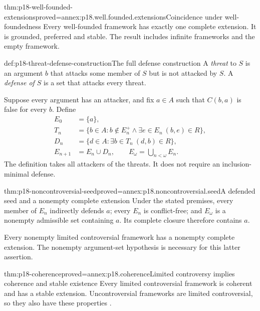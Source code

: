 \begin{hbtheorem}{thm:p18-well-founded-extensions}{proved=annex:p18.well.founded.extensions}{Coincidence under well-foundedness}
Every well-founded framework has exactly one
complete extension. It is grounded, preferred
and stable. The result includes infinite
frameworks and the empty framework.
\end{hbtheorem}

\begin{hbdefinition}{def:p18-threat-defense-construction}{The full defense construction}
A \emph{threat} to \(S\) is an argument \(b\)
that attacks some member of \(S\) but is
not attacked by \(S\). A \emph{defense of \(S\)}
is a set that attacks every threat.

Suppose every argument has an attacker, and
fix \(a\in A\) such that \(C(b,a)\) is false
for every \(b\). Define
\[
\begin{aligned}
 E_0&=\{a\},\\
 T_n&=\{b\in A:b\notin E_n^+\land\exists e\in E_n\ (b,e)\in R\},\\
 D_n&=\{d\in A:\exists b\in T_n\ (d,b)\in R\},\\
 E_{n+1}&=E_n\cup D_n,\qquad E_\omega=\bigcup_{n<\omega}E_n.
\end{aligned}
\]
The definition takes all attackers of the threats.
It does not require an inclusion-minimal defense.
\end{hbdefinition}

\begin{hblemma}{thm:p18-noncontroversial-seed}{proved=annex:p18.noncontroversial.seed}{A defended seed and a nonempty complete extension}
Under the stated premises, every member of
\(E_n\) indirectly defends \(a\); every
\(E_n\) is conflict-free; and \(E_\omega\)
is a nonempty admissible set containing
\(a\). Its complete closure therefore
contains \(a\).

Every nonempty limited controversial framework
has a nonempty complete extension. The
nonempty argument-set hypothesis is necessary
for this latter assertion.
\end{hblemma}

\begin{hbtheorem}{thm:p18-coherence}{proved=annex:p18.coherence}{Limited controversy implies coherence and stable existence}
Every limited controversial framework is
coherent and has a stable extension.
Uncontroversial frameworks are limited
controversial, so they also have these
properties \cite[theorem~33(1), corollary~36]{Dung1995}.
\end{hbtheorem}

